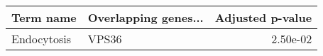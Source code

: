 \begin{tabular}{llr}
\toprule
  Term name & Overlapping genes... &  Adjusted p-value \\
\midrule
Endocytosis &                VPS36 &          2.50e-02 \\
\bottomrule
\end{tabular}
